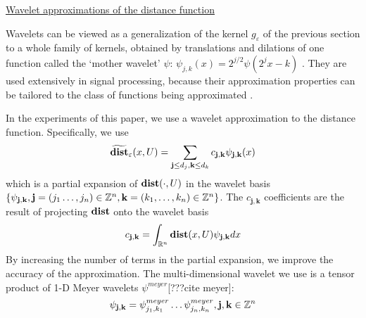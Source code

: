 \underline{Wavelet approximations of the distance function}

Wavelets can be viewed as a generalization of the kernel $g_\varepsilon$ of the previous section to a whole family of kernels, obtained by translations and dilations of one function called the `mother wavelet' $\psi$: $\psi_{j,k}(x) = 2^{j/2}\psi(2^jx - k)$  \cite{MallatBook}.
They are used extensively in signal processing, because their approximation properties can be tailored to the class of functions being approximated \cite{MallatBook}.

In the experiments of this paper, we use a wavelet approximation to the distance function.
Specifically, we use
\[\widetilde{\mathbf{dist}}_\varepsilon(x,U) =  \sum_{\mathbf{j}\leq d_j,\mathbf{k}\leq d_k}c_{\mathbf{j,k}}\psi_{\mathbf{j,k}}(x)\]
which is a partial expansion of $\mathbf{dist}(\cdot,U)$ in the wavelet basis $\{\psi_{\mathbf{j,k}}, \mathbf{j} = (j_1\ldots,j_n) \in \mathbb{Z}^n, \mathbf{k} = (k_1,\ldots,k_n) \in \mathbb{Z}^n\}$.
The $c_{\mathbf{j,k}}$ coefficients are the result of projecting $\mathbf{dist}$ onto the wavelet basis
\[ c_{\mathbf{j,k}} = \int_{\mathbb{R}^n}\mathbf{dist}(x,U)\psi_{\mathbf{j,k}}dx\]
By increasing the number of terms in the partial expansion, we improve the accuracy of the approximation.
The multi-dimensional wavelet we use is a tensor product of 1-D Meyer wavelets $\psi^{meyer}$[???cite meyer]:
\begin{equation}
\label{eq:multid meyer}
\psi_{\mathbf{j,k}} = \psi_{j_1,k_1}^{meyer}\ldots \psi_{j_n,k_n}^{meyer}, \mathbf{j,k} \in \mathbb{Z}^n
\end{equation}

 
